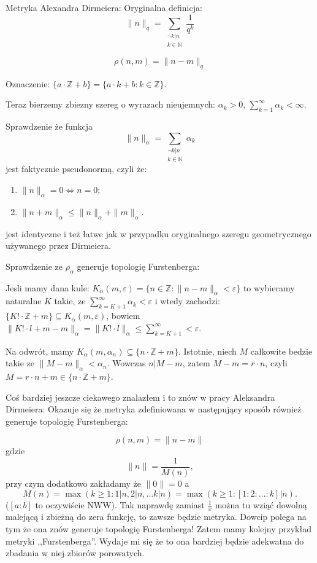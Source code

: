 \documentclass[12pt]{amsart}
\begin{document}
Metryka Alexandra Dirmeiera:
Oryginalna definicja: 
\[ \| n \|_q = \sum_{\substack{\neg k | n \\ k \in \mathbb{N}}} \frac{1}{q^k} \]

\[\rho(n,m) = \| n - m \|_q\]

Oznaczenie:
$\{a \cdot \mathbb{Z} + b\} = \{ a \cdot k + b: k \in \mathbb{Z}\}$.

Teraz bierzemy zbiezny szereg o wyrazach nieujemnych:
$\alpha_k > 0$, $\sum_{k = 1}^\infty \alpha_k < \infty$.

Sprawdzenie że funkcja 
\[
\| n \|_\alpha = \sum_{\substack{\neg k | n \\ k \in \mathbb{N}}} \alpha_k 
\]  
jest faktycznie pseudonormą, czyli że:
\begin{enumerate}
\item
  $\| n \|_\alpha = 0 \iff n = 0;$
\item
  $\|n + m\|_\alpha \leq \| n \|_\alpha + \| m \|_\alpha$. 
\end{enumerate}
jest identyczne i też łatwe jak w przypadku oryginalnego
szeregu geometrycznego używanego przez Dirmeiera.

Sprawdzenie ze $\rho_\alpha$ generuje topologię Furstenberga:

Jesli mamy dana kule: 
$K_\alpha(m,\varepsilon) = \{ n \in \mathbb{Z}: \| n - m\|_\alpha < \varepsilon\}$
to wybieramy naturalne $K$ takie, ze
$\sum_{k = K + 1}^\infty \alpha_k < \varepsilon$ i wtedy zachodzi:
  $\{ K! \cdot \mathbb{Z} + m\} \subseteq K_\alpha(m,\varepsilon)$, 
bowiem 
  $\| K! \cdot l + m - m \|_\alpha = \| K! \cdot l \|_\alpha \leq \sum_{k = K + 1}^\infty < \varepsilon$.
  
Na odwrót, mamy 
$K_\alpha(m, \alpha_n) \subseteq \{n \cdot\mathbb{Z} + m\}$.
Istotnie, niech $M$ całkowite bedzie takie ze 
$\|M - m\|_\alpha < \alpha_n$. Wowczas
$n | M - m$, zatem $M - m = r\cdot n$, czyli $M = r\cdot n + m \in 
\{n \cdot\mathbb{Z} + m\}$. 


Coś bardziej jeszcze ciekawego znalazłem i to znów w pracy Aleksandra Dirmeiera:
Okazuje się że metryka zdefiniowana w następujący sposób również generuje topologię Furstenberga:

\[
\rho(n,m) = \| n - m \|
\]
gdzie
\[
  \| n \| = \frac{1}{M(n)},
\]
przy czym dodatkowo zakładamy że $\|0\| = 0$
a
\[
M(n) = \max(k \geq 1 \colon 1 | n, 2|n, \ldots k | n) = \max(k \geq 1\colon [1:2:\ldots:k] | n).
\]
($[a:b]$ to oczywiście NWW).
Tak naprawdę zamiast $\frac{1}{x}$ można tu wziąć dowolną malejącą i zbieżną do zera
funkcję, to zawsze będzie metryka. 
Dowcip polega na tym że ona znów generuje topologię Furstenberga! Zatem mamy kolejny
przykład metryki ,,Furstenberga''. Wydaje mi się że to ona bardziej 
będzie adekwatna do zbadania w niej zbiorów porowatych. 
\end{document}
